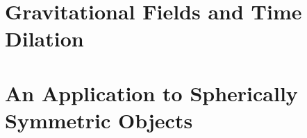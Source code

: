 \documentclass[12pt]{article}
\theoremstyle{definition}
\theoremstyle{remark}
\begin{document}
\section{Gravitational Fields and Time Dilation}

\section{An Application to Spherically Symmetric Objects}













































\end{document}
